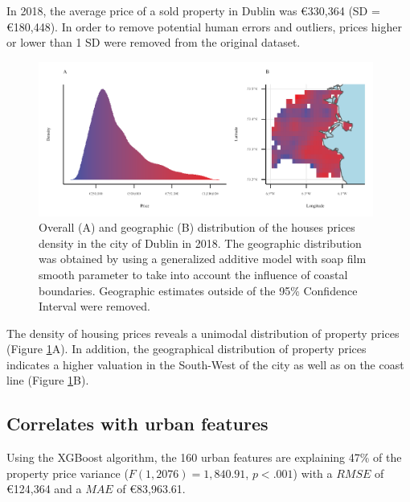 \documentclass[conference,final,]{IEEEtran}
\begin{document}
In 2018, the average price of a sold property in Dublin was €330,364 (SD = €180,448). In order to remove potential human errors and outliers, prices higher or lower than 1 SD were removed from the original dataset.

\begin{figure}
\includegraphics[width=0.98\textwidth]{dsaa_application_manuscript_files/figure-latex/distrib-plot-1} \caption{Overall (A) and geographic (B) distribution of the houses prices density in the city of Dublin in 2018. The geographic distribution was obtained by using a generalized additive model with soap film smooth parameter to take into account the influence of coastal boundaries. Geographic estimates outside of the 95\% Confidence Interval were removed.}\label{fig:distrib-plot}
\end{figure}

The density of housing prices reveals a unimodal distribution of property prices (Figure \ref{fig:distrib-plot}A). In addition, the geographical distribution of property prices indicates a higher valuation in the South-West of the city as well as on the coast line (Figure \ref{fig:distrib-plot}B).

\hypertarget{correlates-with-urban-features}{%
\subsection{Correlates with urban features}\label{correlates-with-urban-features}}

Using the XGBoost algorithm, the 160 urban features are explaining 47\% of the property price variance (\(F(1, 2076) = 1,840.91\), \(p < .001\)) with a \(RMSE\) of €124,364 and a \(MAE\) of €83,963.61.
\end{document}
